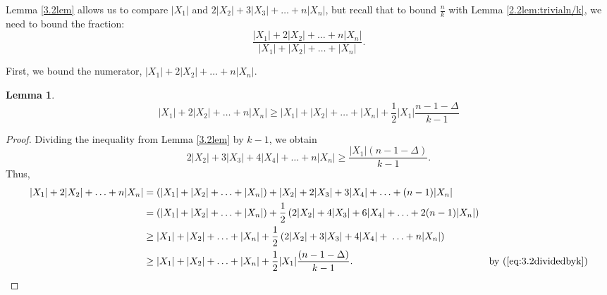\documentclass{amsart}
\newcommand{\1}{\mathds{1}}
\newtheorem{lemma}[theorem]{Lemma}
\numberwithin{theorem}{section}
\newcommand{\Xsum}{|X_1|+|X_2|+\ldots+|X_n|}
\newcommand{\wXsum}{|X_1|+2|X_2|+\ldots +n|X_n|}
\begin{document}
Lemma \ref{3.2lem} allows us to compare $|X_1|$ and $2|X_2|+ 3|X_3|+ \ldots + n|X_n|$, but recall that to bound $\frac{n}{k}$ with Lemma \ref{2.2lem:trivialn/k}, we need to bound the fraction:
   $$ \frac{|X_1|+2|X_2|+ \ldots + n|X_n|}{|X_1|+|X_2| +\ldots + |X_n|}. $$ 

First, we bound the numerator, $|X_1|+2|X_2|+\ldots +n|X_n|$.






\begin{lemma}\label{3.5lem-num} %
$$\wXsum \geq\Xsum + \frac{1}{2}|X_1|\frac{n-1-\Delta}{k-1}$$
\end{lemma}

\begin{proof}
Dividing the inequality from Lemma \ref{3.2lem} by $k-1$, we obtain
\begin{equation}\label{eq:3.2dividedbyk}
     2|X_2|+3|X_3|+4|X_4|+\ldots +n|X_n| \geq \frac{|X_1|(n-1-\Delta) }{k-1}.
\end{equation}
Thus, 
\begin{align*}
    \wXsum &= (\Xsum) + |X_2|+2|X_3|+3|X_4|+\ldots +(n-1)|X_n| \\ 
    & = (\Xsum) +\frac{1}{2} \left(2|X_2|+4|X_3|+6|X_4|+\ldots +2(n-1)|X_n|\right) \\
    &\geq \Xsum + \frac{1}{2} \left( 2|X_2|+3|X_3|+4|X_4|+\;\ldots +n|X_n|\right)
    \\&\geq \Xsum +\frac{1}{2}|X_1|\frac{(n-1-\Delta)}{k-1}. &\text{by (\ref{eq:3.2dividedbyk})}
\end{align*}
\end{proof}
\end{document}
